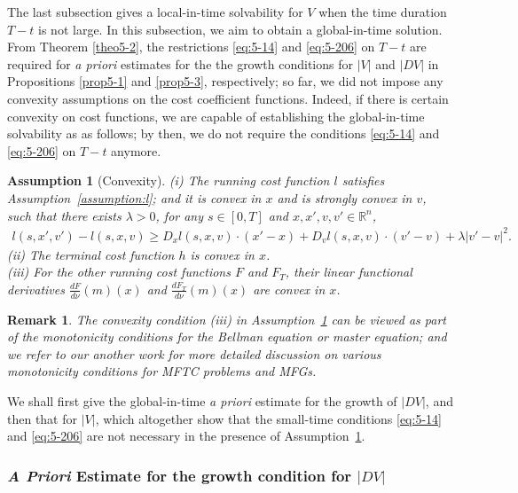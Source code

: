 \documentclass[11pt]{article}
\numberwithin{equation}{section}
\newtheorem{assumption}{Assumption}[section]
\newtheorem{remark}{Remark}[section]
\newcommand{\brn}{{\mathbb{R}^n}}
\newcommand{\1}{\mbox{1\hspace{-1mm}I}}
\begin{document}
The last subsection gives a local-in-time solvability for $V$ when the time duration $T-t$ is not large. In this subsection, we aim to obtain a global-in-time solution. From Theorem \ref{theo5-2}, the restrictions \eqref{eq:5-14} and \eqref{eq:5-206} on $T-t$ are required for \textit{a priori} estimates for the the growth conditions for $|V|$ and $|DV|$ in Propositions \ref{prop5-1} and \ref{prop5-3}, respectively; so far, we did not impose any convexity assumptions on the cost coefficient functions. Indeed, if there is certain convexity on cost functions, we are capable of establishing the global-in-time solvability as as follows; by then, we do not require the conditions \eqref{eq:5-14} and \eqref{eq:5-206} on $T-t$ anymore.

\begin{assumption}[Convexity]\label{assumption:convex}
    (i) The running cost function $l$ satisfies Assumption~\ref{assumption:l}; and it is convex in $x$ and is strongly convex in $v$, such that there exists $\lambda>0$, for any $s\in[0,T]$ and $x,x',v,v'\in\brn$,
    \begin{align}\label{condition:lambda}
        l(s,x',v')-l(s,x,v)\geq D_xl(s,x,v)\cdot (x'-x)+D_vl(s,x,v)\cdot (v'-v)+\lambda|v'-v|^2. 
    \end{align}
    (ii) The terminal cost function $h$ is convex in $x$.\\
    (iii) For the other running cost functions $F$ and $F_T$, their linear functional derivatives $\frac{dF}{d\nu}(m)(x)$ and $\frac{dF_T}{d\nu}(m)(x)$ are convex in $x$.
\end{assumption}

\begin{remark}
    The convexity condition (iii) in Assumption~\ref{assumption:convex} can be viewed as part of the monotonicity conditions for the Bellman equation or master equation; and we refer to our another work \cite{AB12} for more detailed discussion on various monotonicity conditions for MFTC problems and MFGs.
\end{remark}

We shall first give the global-in-time \textit{a priori} estimate for the growth of $|DV|$, and then that for $|V|$, which altogether show that the small-time conditions \eqref{eq:5-14} and \eqref{eq:5-206} are not necessary in the presence of Assumption~\ref{assumption:convex}.

\subsubsection{\textit{A Priori} Estimate for the growth condition for $|DV|$}
\end{document}
